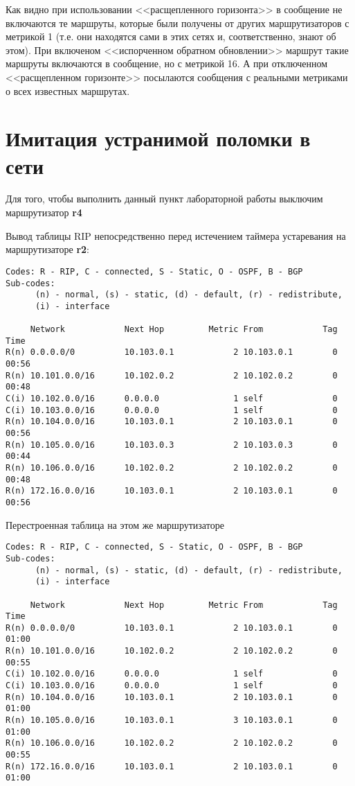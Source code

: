 \documentclass[a4paper,12pt]{article}
\begin{document}
Как видно при использовании <<расщепленного горизонта>> в сообщение не
включаются те маршруты, которые были получены от других маршрутизаторов
с метрикой 1 (т.е. они находятся сами в этих сетях и, соответственно, знают об этом).
При включеном <<испорченном обратном обновлении>> маршрут такие маршруты
включаются в сообщение, но с метрикой 16. А при отключенном <<расщепленном
горизонте>> посылаются сообщения с реальными метриками о всех известных
маршрутах.

\section{Имитация устранимой поломки в сети}

Для того, чтобы выполнить данный пункт лабораторной работы выключим
маршрутизатор \textbf{r4}

Вывод таблицы RIP непосредственно перед истечением таймера устаревания на маршрутизаторе \textbf{r2}:
\begin{Verbatim}
Codes: R - RIP, C - connected, S - Static, O - OSPF, B - BGP
Sub-codes:
      (n) - normal, (s) - static, (d) - default, (r) - redistribute,
      (i) - interface

     Network            Next Hop         Metric From            Tag Time
R(n) 0.0.0.0/0          10.103.0.1            2 10.103.0.1        0 00:56
R(n) 10.101.0.0/16      10.102.0.2            2 10.102.0.2        0 00:48
C(i) 10.102.0.0/16      0.0.0.0               1 self              0
C(i) 10.103.0.0/16      0.0.0.0               1 self              0
R(n) 10.104.0.0/16      10.103.0.1            2 10.103.0.1        0 00:56
R(n) 10.105.0.0/16      10.103.0.3            2 10.103.0.3        0 00:44
R(n) 10.106.0.0/16      10.102.0.2            2 10.102.0.2        0 00:48
R(n) 172.16.0.0/16      10.103.0.1            2 10.103.0.1        0 00:56
\end{Verbatim}

Перестроенная таблица на этом же маршрутизаторе
\begin{Verbatim}
Codes: R - RIP, C - connected, S - Static, O - OSPF, B - BGP
Sub-codes:
      (n) - normal, (s) - static, (d) - default, (r) - redistribute,
      (i) - interface

     Network            Next Hop         Metric From            Tag Time
R(n) 0.0.0.0/0          10.103.0.1            2 10.103.0.1        0 01:00
R(n) 10.101.0.0/16      10.102.0.2            2 10.102.0.2        0 00:55
C(i) 10.102.0.0/16      0.0.0.0               1 self              0
C(i) 10.103.0.0/16      0.0.0.0               1 self              0
R(n) 10.104.0.0/16      10.103.0.1            2 10.103.0.1        0 01:00
R(n) 10.105.0.0/16      10.103.0.1            3 10.103.0.1        0 01:00
R(n) 10.106.0.0/16      10.102.0.2            2 10.102.0.2        0 00:55
R(n) 172.16.0.0/16      10.103.0.1            2 10.103.0.1        0 01:00
\end{Verbatim}
\end{document}
